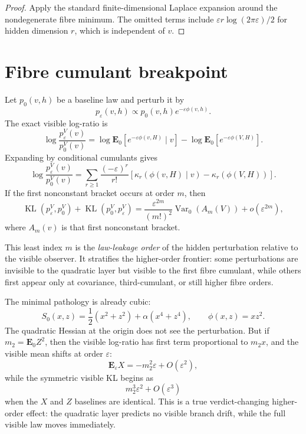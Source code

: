 \documentclass[11pt,a4paper]{article}
\numberwithin{equation}{section}
\DeclareMathOperator{\Var}{Var}
\DeclareMathOperator{\KL}{KL}
\newcommand{\E}{\mathbf E}
\theoremstyle{thmcompact}
\theoremstyle{remark}
\begin{document}
\begin{proof}
Apply the standard finite-dimensional Laplace expansion around the nondegenerate fibre minimum. The omitted terms include $\varepsilon r\log(2\pi\varepsilon)/2$ for hidden dimension $r$, which is independent of $v$.
\end{proof}

\section{Fibre cumulant breakpoint}

Let $p_0(v,h)$ be a baseline law and perturb it by
\[
p_\varepsilon(v,h)\propto p_0(v,h)e^{-\varepsilon\phi(v,h)}.
\]
The exact visible log-ratio is
\begin{equation}
\log\frac{p_\varepsilon^V(v)}{p_0^V(v)}
=\log\E_0[e^{-\varepsilon\phi(v,H)}\mid v]
-\log\E_0[e^{-\varepsilon\phi(V,H)}].
\label{eq:fibre-log-ratio}
\end{equation}
Expanding by conditional cumulants gives
\begin{equation}
\log\frac{p_\varepsilon^V(v)}{p_0^V(v)}
=\sum_{r\ge1}\frac{(-\varepsilon)^r}{r!}
\left[
\kappa_r(\phi(v,H)\mid v)-\kappa_r(\phi(V,H))
\right].
\label{eq:fibre-cumulants}
\end{equation}
If the first nonconstant bracket occurs at order $m$, then
\begin{equation}
\KL(p_\varepsilon^V,p_0^V)+\KL(p_0^V,p_\varepsilon^V)
=\frac{\varepsilon^{2m}}{(m!)^2}
\Var_0(A_m(V))+o(\varepsilon^{2m}),
\label{eq:fibre-sym-kl}
\end{equation}
where $A_m(v)$ is that first nonconstant bracket.

This least index $m$ is the \emph{law-leakage order} of the hidden perturbation relative to the visible observer. It stratifies the higher-order frontier: some perturbations are invisible to the quadratic layer but visible to the first fibre cumulant, while others first appear only at covariance, third-cumulant, or still higher fibre orders.

The minimal pathology is already cubic:
\[
S_0(x,z)=\frac12(x^2+z^2)+\alpha(x^4+z^4),
\qquad
\phi(x,z)=xz^2.
\]
The quadratic Hessian at the origin does not see the perturbation. But if $m_2=\E_0Z^2$, then the visible log-ratio has first term proportional to $m_2x$, and the visible mean shifts at order $\varepsilon$:
\[
\E_\varepsilon X=-m_2^2\varepsilon+O(\varepsilon^2),
\]
while the symmetric visible KL begins as
\[
m_2^3\varepsilon^2+O(\varepsilon^3)
\]
when the $X$ and $Z$ baselines are identical. This is a true verdict-changing higher-order effect: the quadratic layer predicts no visible branch drift, while the full visible law moves immediately.
\end{document}
